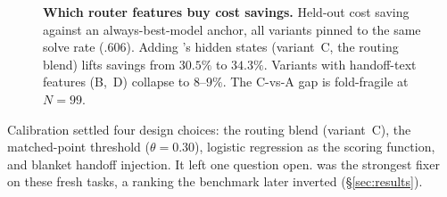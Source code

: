 \begin{figure}[!tbp]
  \centering
  
  \caption{\textbf{Which router features buy cost savings.}
  Held-out cost saving against an always-best-model anchor, all variants
  pinned to the same solve rate ($.606$).  Adding \modelname's hidden
  states (variant~C, the routing blend) lifts savings from $30.5\%$ to $34.3\%$.
  Variants with handoff-text features (B,~D) collapse to $8$--$9\%$.
  The C-vs-A gap is fold-fragile at $N{=}99$.}
  \label{fig:design-space}
\end{figure}

Calibration settled four design choices: the routing blend (variant~C), the matched-point threshold ($\theta{=}0.30$), logistic regression as the scoring function, and blanket handoff injection.
It left one question open.
\fxgpt was the strongest fixer on these fresh tasks, a ranking the benchmark later inverted (\S\ref{sec:results}).

\FloatBarrier
